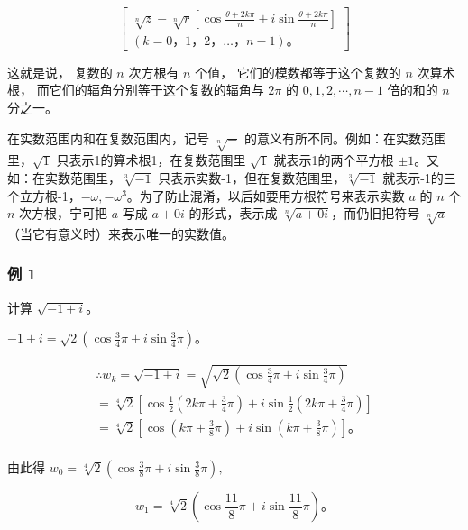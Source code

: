 \[
\left[ \begin{array}{c} \sqrt [ n ]{z} - \sqrt [ n ]{r} \left[ \cos \frac {\theta + 2 k \pi}{n} + i \sin \frac {\theta + 2 k \pi}{n} \right] \\ (k = 0\text{，} 1\text{，} 2\text{，} \dots \text{，} n - 1)\text{。} \end{array} \right]
\]

这就是说， 复数的 \(n\) 次方根有 \(n\) 个值， 它们的模数都等于这个复数的
\(n\) 次算术根， 而它们的辐角分别等于这个复数的辐角与 \(2\pi\) 的
\(0, 1, 2, \cdots, n-1\) 倍的和的 \(n\) 分之一。


在实数范围内和在复数范围内，记号 \(\sqrt[n]{-}\)
的意义有所不同。例如：在实数范围里，\(\sqrt{1}\)
只表示1的算术根1，在复数范围里 \(\sqrt{1}\) 就表示1的两个平方根
\(\pm 1\)。又如：在实数范围里，\(\sqrt[3]{-1}\)
只表示实数-1，但在复数范围里，\(\sqrt[3]{-1}\)
就表示-1的三个立方根-1，\(-\omega, -\omega^3\)。为了防止混淆，以后如要用方根符号来表示实数
\(a\) 的 \(n\) 个 \(n\) 次方根，宁可把 \(a\) 写成 \(a + 0i\)
的形式，表示成 \(\sqrt[n]{a + 0i}\)，而仍旧把符号
\(\sqrt[n]{a}\)（当它有意义时）来表示唯一的实数值。

\subsubsection{例 1}

计算 \(\sqrt{-1 + i}\)。

\(-1 + i = \sqrt{2}\left(\cos \frac{3}{4}\pi + i \sin \frac{3}{4}\pi\right)\)。

\[
\begin{array}{l} \therefore w _ {k} = \sqrt {- 1 + i} = \sqrt {\sqrt {2} \left(\cos \frac {3}{4} \pi + i \sin \frac {3}{4} \pi\right)} \\ = \sqrt[4]{2} \left[ \cos \frac {1}{2} \left(2 k \pi + \frac {3}{4} \pi\right) + i \sin \frac {1}{2} \left(2 k \pi + \frac {3}{4} \pi\right) \right] \\ = \sqrt[4]{2} \left[ \cos \left(k \pi + \frac {3}{8} \pi\right) + i \sin \left(k \pi + \frac {3}{8} \pi\right) \right]\text{。} \\ \end{array}
\]

由此得
\(w_{0} = \sqrt[4]{2}\left(\cos \frac{3}{8}\pi + i\sin \frac{3}{8}\pi\right),\)

\[
w _ {1} = \sqrt[4]{2} \left(\cos \frac {11}{8} \pi + i \sin \frac {11}{8} \pi\right)\text{。}
\]

